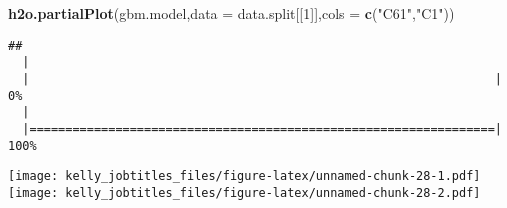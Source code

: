 \documentclass[]{article}
\newenvironment{Shaded}{\begin{snugshade}}{\end{snugshade}}
\newcommand{\KeywordTok}[1]{\textcolor[rgb]{0.13,0.29,0.53}{\textbf{{#1}}}}
\newcommand{\DataTypeTok}[1]{\textcolor[rgb]{0.13,0.29,0.53}{{#1}}}
\newcommand{\DecValTok}[1]{\textcolor[rgb]{0.00,0.00,0.81}{{#1}}}
\newcommand{\StringTok}[1]{\textcolor[rgb]{0.31,0.60,0.02}{{#1}}}
\newcommand{\NormalTok}[1]{{#1}}
\begin{document}
\begin{Shaded}
\begin{Highlighting}[]
\KeywordTok{h2o.partialPlot}\NormalTok{(gbm.model,}\DataTypeTok{data =} \NormalTok{data.split[[}\DecValTok{1}\NormalTok{]],}\DataTypeTok{cols =} \KeywordTok{c}\NormalTok{(}\StringTok{"C61"}\NormalTok{,}\StringTok{"C1"}\NormalTok{))}
\end{Highlighting}
\end{Shaded}

\begin{verbatim}
## 
  |                                                                       
  |                                                                 |   0%
  |                                                                       
  |=================================================================| 100%
\end{verbatim}

\texttt{[image: kelly\_jobtitles\_files/figure-latex/unnamed-chunk-28-1.pdf]}
\texttt{[image: kelly\_jobtitles\_files/figure-latex/unnamed-chunk-28-2.pdf]}
\end{document}
